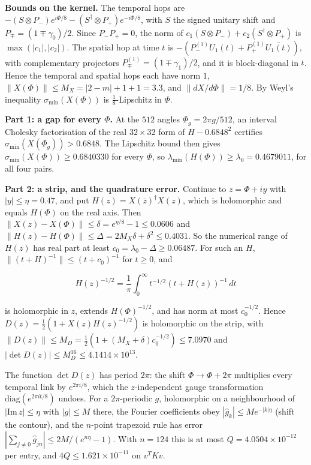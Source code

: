 \documentclass[11pt,a4paper]{article}
\begin{document}
{\bfseries\boldmath Bounds on the kernel.} The temporal hops are $-(S\otimes P_-)e^{i\Phi/8}-(S^\dagger\otimes P_+)e^{-i\Phi/8}$, with $S$ the signed unitary shift and $P_\mp=(1\mp\gamma_0)/2$. Since $P_-P_+=0$, the norm of $c_1(S\otimes P_-)+c_2(S^\dagger\otimes P_+)$ is $\max(|c_1|,|c_2|)$. The spatial hop at time $t$ is $-(P^{(1)}_-U_1(t)+P^{(1)}_+\overline{U_1(t)})$, with complementary projectors $P^{(1)}_\mp=(1\mp\gamma_1)/2$, and it is block-diagonal in $t$. Hence the temporal and spatial hops each have norm $1$, $\|X(\Phi)\|\le M_X=|2-m|+1+1=3.3$, and $\|dX/d\Phi\|=1/8$. By Weyl's inequality $\sigma_{\min}(X(\Phi))$ is $\tfrac18$-Lipschitz in $\Phi$.

{\bfseries\boldmath Part 1: a gap for every $\Phi$.} At the $512$ angles $\Phi_g=2\pi g/512$, an interval Cholesky factorisation of the real $32\times32$ form of $H-0.6848^2$ certifies $\sigma_{\min}(X(\Phi_g))>0.6848$. The Lipschitz bound then gives $\sigma_{\min}(X(\Phi))\ge0.6840330$ for every $\Phi$, so $\lambda_{\min}(H(\Phi))\ge\lambda_0=0.4679011$, for all four pairs.

{\bfseries\boldmath Part 2: a strip, and the quadrature error.} Continue to $z=\Phi+iy$ with $|y|\le\eta=0.47$, and put $H(z)=X(\bar z)^\dagger X(z)$, which is holomorphic and equals $H(\Phi)$ on the real axis. Then $\|X(z)-X(\Phi)\|\le\delta=e^{\eta/8}-1\le0.0606$ and $\|H(z)-H(\Phi)\|\le\Delta=2M_X\delta+\delta^2\le0.4031$. So the numerical range of $H(z)$ has real part at least $c_0=\lambda_0-\Delta\ge0.06487$. For such an $H$, $\|(t+H)^{-1}\|\le(t+c_0)^{-1}$ for $t\ge0$, and


\begin{equation*}
H(z)^{-1/2}=\frac1\pi\int_0^\infty t^{-1/2}(t+H(z))^{-1}\,dt
\end{equation*}


is holomorphic in $z$, extends $H(\Phi)^{-1/2}$, and has norm at most $c_0^{-1/2}$. Hence $D(z)=\tfrac12(1+X(z)H(z)^{-1/2})$ is holomorphic on the strip, with $\|D(z)\|\le M_D=\tfrac12(1+(M_X+\delta)c_0^{-1/2})\le7.0970$ and $|\det D(z)|\le M_D^{16}\le4.1414\times10^{13}$.

The function $\det D(z)$ has period $2\pi$: the shift $\Phi\to\Phi+2\pi$ multiplies every temporal link by $e^{2\pi i/8}$, which the $z$-independent gauge transformation $\mathrm{diag}(e^{2\pi it/8})$ undoes. For a $2\pi$-periodic $g$, holomorphic on a neighbourhood of $|\mathrm{Im}\,z|\le\eta$ with $|g|\le M$ there, the Fourier coefficients obey $|\hat g_k|\le Me^{-|k|\eta}$ (shift the contour), and the $n$-point trapezoid rule has error $|\sum_{j\ne0}\hat g_{jn}|\le 2M/(e^{n\eta}-1)$. With $n=124$ this is at most $Q=4.0504\times10^{-12}$ per entry, and $4Q\le1.621\times10^{-11}$ on $v^TKv$.
\end{document}
